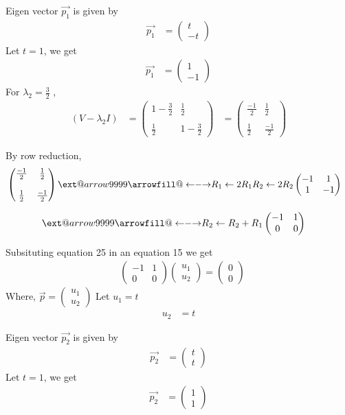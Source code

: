 \documentclass[journal,12pt,twocolumn]{IEEEtran}
\makeatletter
\newcommand\xleftrightarrow[2][]{%
  \ext@arrow 9999{\longleftrightarrowfill@}{#1}{#2}}
\newcommand\longleftrightarrowfill@{%
  \arrowfill@\leftarrow\relbar\rightarrow}
\newcommand{\myvec}[1]{\ensuremath{\begin{pmatrix}#1\end{pmatrix}}}
\makeatother
\begin{document}
Eigen vector $\vec{p_1}$ is given by
\begin{align}
    \vec{p_1}&=\myvec{t \\ -t}
\end{align}
Let $t=1$, we get
\begin{align}
        \vec{p_1}&=\myvec{1 \\-1 }
\end{align}
For $\lambda_2=\frac{3}{2}$ ,
\begin{align}
(V-\lambda_2 I)&=\myvec{1-\frac{3}{2} & \frac{1}{2} \\\\\frac{1}{2} & 1-\frac{3}{2}}
&=\myvec{\frac{-1}{2} & \frac{1}{2} \\\\\frac{1}{2} & \frac{-1}{2}}
\end{align}

By row reduction,
\begin{align}
&\myvec{\frac{-1}{2} & \frac{1}{2}\\ \\ \frac{1}{2} & \frac{-1}{2}}
\xleftrightarrow[R_1\leftarrow 2R_1]{R_2\leftarrow 2R_2}
\myvec{-1 & 1 \\ 1 & -1}
\end{align}

\begin{align}
&\xleftrightarrow{R_2\leftarrow R_2 + R_1}
\myvec{-1 & 1 \\ 0 & 0 }
\end{align}

Subsituting equation 25 in an equation 15 we get
\begin{align}
        &   \myvec{-1 & 1 \\ 0& 0}\myvec{u_1 \\ u_2}=\myvec{0 \\ 0}
\end{align}
Where, $\vec{p}=\myvec{u_1\\u_2}$
Let $u_1=t$
\begin{align}
    u_2&=t
\end{align}


Eigen vector $\vec{p_2}$ is given by
\begin{align}
    \vec{p_2}&=\myvec{t \\ t}
\end{align}
Let $t=1$, we get
\begin{align}
        \vec{p_2}&=\myvec{1 \\1 }
\end{align}
\end{document}
